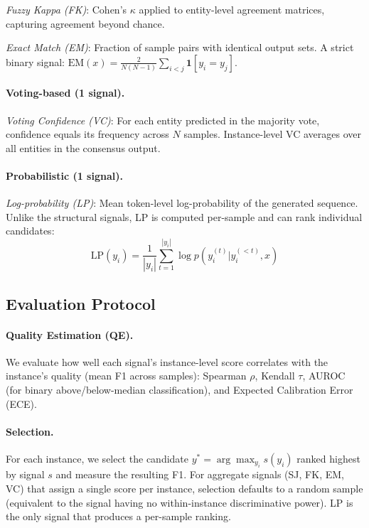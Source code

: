 \documentclass[11pt,a4paper]{article}
\begin{document}
\emph{Fuzzy Kappa (FK)}: Cohen's $\kappa$ applied to entity-level agreement matrices, capturing agreement beyond chance.

\emph{Exact Match (EM)}: Fraction of sample pairs with identical output sets. A strict binary signal: $\text{EM}(x) = \frac{2}{N(N-1)} \sum_{i<j} \mathbf{1}[y_i = y_j]$.

\paragraph{Voting-based (1 signal).}
\emph{Voting Confidence (VC)}: For each entity predicted in the majority vote, confidence equals its frequency across $N$ samples. Instance-level VC averages over all entities in the consensus output.

\paragraph{Probabilistic (1 signal).}
\emph{Log-probability (LP)}: Mean token-level log-probability of the generated sequence. Unlike the structural signals, LP is computed per-sample and can rank individual candidates:
\begin{equation}
    \text{LP}(y_i) = \frac{1}{|y_i|}\sum_{t=1}^{|y_i|} \log p(y_i^{(t)} | y_i^{(<t)}, x)
\end{equation}

\subsection{Evaluation Protocol}

\paragraph{Quality Estimation (QE).}
We evaluate how well each signal's instance-level score correlates with the instance's quality (mean F1 across samples):
Spearman $\rho$, Kendall $\tau$, AUROC (for binary above/below-median classification), and Expected Calibration Error (ECE).

\paragraph{Selection.}
For each instance, we select the candidate $y^* = \arg\max_{y_i} s(y_i)$ ranked highest by signal $s$ and measure the resulting F1.
For aggregate signals (SJ, FK, EM, VC) that assign a single score per instance, selection defaults to a random sample (equivalent to the signal having no within-instance discriminative power).
LP is the only signal that produces a per-sample ranking.
\end{document}
